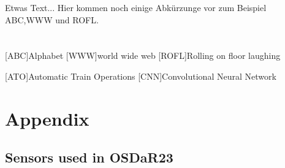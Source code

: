 \documentclass[Master,MDS,english]{BASE/twbook} %
\begin{document}
Etwas Text... Hier kommen noch einige Abkürzunge vor zum Beispiel \ac{ABC},\ac{WWW} und \ac{ROFL}.




\clearpage                                                       %


\clearpage

\listoffigures                                                   %
\clearpage

\listoftables                                                    %
\clearpage

\listoflistings                                                  %
\clearpage

{}
\chapter*{\listacroname}
\begin{acronym}[XXXXX]
    [ABC]{Alphabet}
    [WWW]{world wide web}
    [ROFL]{Rolling on floor laughing}
    
    
    
    [ATO]{Automatic Train Operations}
    [CNN]{Convolutional Neural Network}
    
\end{acronym}
\clearpage


\appendix
\chapter{Appendix}

\section{Sensors used in OSDaR23} \label{app:sensors}
\end{document}
